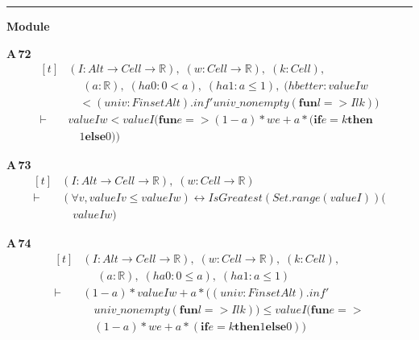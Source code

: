 \vspace{4pt}\noindent\rule{\columnwidth}{0.4pt}\par\vspace{2pt}
\noindent\textbf{Module }\par\vspace{3pt}

\noindent\textbf{A\,72}\quad{}
{\footnotesize\[ \begin{aligned}[t]
&(\mathit{I} : \mathit{Alt} \to \mathit{Cell} \to \mathbb{R} ),\; (\mathit{w} : \mathit{Cell} \to \mathbb{R} ),\; (\mathit{k} : \mathit{Cell}),\\
&\quad \; (\mathit{a} : \mathbb{R} ),\; (\mathit{ha0} : 0 < \mathit{a}),\; (\mathit{ha1} : \mathit{a} \leq 1),\; (\mathit{hbetter} : \mathit{value} \mathit{I} \mathit{w}\\
&\quad < (\mathit{univ} : \mathit{Finset} \mathit{Alt}).\mathit{inf'} \mathit{univ\_nonempty} (\mathbf{fun} \mathit{l} => \mathit{I} \mathit{l} \mathit{k}))\\
\vdash\;&\mathit{value} \mathit{I} \mathit{w} < \mathit{value} \mathit{I} (\mathbf{fun} \mathit{e} => (1 - \mathit{a}) * \mathit{w} \mathit{e} + \mathit{a} * (\mathbf{if} \mathit{e} = \mathit{k} \mathbf{then}\\
&\quad 1 \mathbf{else} 0))
\end{aligned} \]}

\noindent\textbf{A\,73}\quad{}
{\footnotesize\[ \begin{aligned}[t]
&(\mathit{I} : \mathit{Alt} \to \mathit{Cell} \to \mathbb{R} ),\; (\mathit{w} : \mathit{Cell} \to \mathbb{R} )\\
\vdash\;&(\forall \mathit{v}, \mathit{value} \mathit{I} \mathit{v} \leq \mathit{value} \mathit{I} \mathit{w}) \leftrightarrow \mathit{IsGreatest} (\mathit{Set}.\mathit{range} (\mathit{value} \mathit{I})) (\\
&\quad \mathit{value} \mathit{I} \mathit{w})
\end{aligned} \]}

\noindent\textbf{A\,74}\quad{}
{\footnotesize\[ \begin{aligned}[t]
&(\mathit{I} : \mathit{Alt} \to \mathit{Cell} \to \mathbb{R} ),\; (\mathit{w} : \mathit{Cell} \to \mathbb{R} ),\; (\mathit{k} : \mathit{Cell}),\\
&\quad \; (\mathit{a} : \mathbb{R} ),\; (\mathit{ha0} : 0 \leq \mathit{a}),\; (\mathit{ha1} : \mathit{a} \leq 1)\\
\vdash\;&(1 - \mathit{a}) * \mathit{value} \mathit{I} \mathit{w} + \mathit{a} * ((\mathit{univ} : \mathit{Finset} \mathit{Alt}).\mathit{inf'}\\
&\quad \mathit{univ\_nonempty} (\mathbf{fun} \mathit{l} => \mathit{I} \mathit{l} \mathit{k})) \leq \mathit{value} \mathit{I} (\mathbf{fun} \mathit{e} =>\\
&\quad (1 - \mathit{a}) * \mathit{w} \mathit{e} + \mathit{a} * (\mathbf{if} \mathit{e} = \mathit{k} \mathbf{then} 1 \mathbf{else} 0))
\end{aligned} \]}

